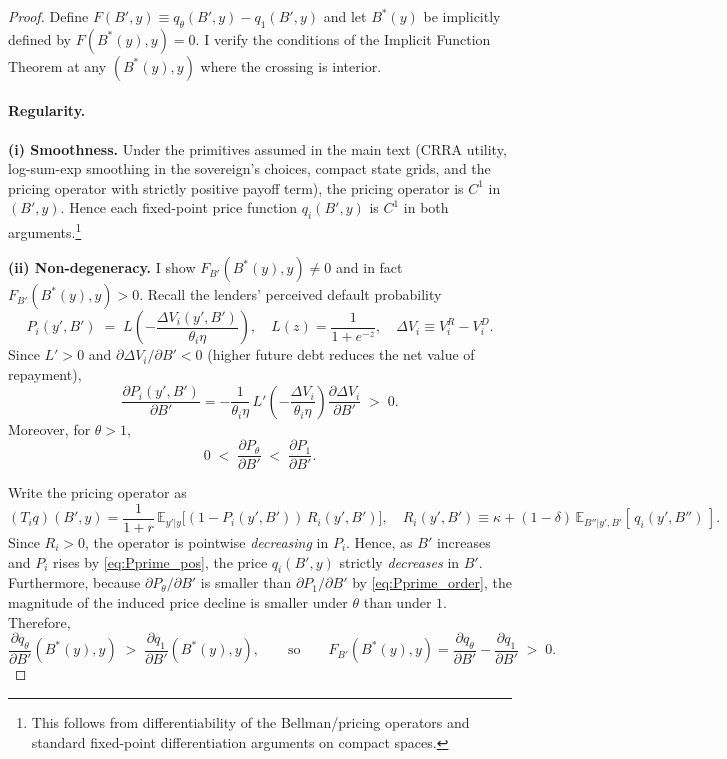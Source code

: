\documentclass[12pt]{article}
\theoremstyle{plain}
\newcommand{\E}{\mathbb{E}}
\begin{document}
\begin{proof}
	Define \(F(B',y)\equiv q_\theta(B',y)-q_1(B',y)\) and let \(B^*(y)\) be implicitly defined by \(F(B^*(y),y)=0\).
	I verify the conditions of the Implicit Function Theorem at any \((B^*(y),y)\) where the crossing is interior.

	\paragraph{Regularity.}
	\textbf{(i) Smoothness.} Under the primitives assumed in the main text (CRRA utility, log-sum-exp smoothing in the sovereign’s choices, compact state grids, and the pricing operator with strictly positive payoff term), the pricing operator is \(C^1\) in \((B',y)\). Hence each fixed-point price function \(q_i(B',y)\) is \(C^1\) in both arguments.\footnote{This follows from differentiability of the Bellman/pricing operators and standard fixed-point differentiation arguments on compact spaces.}

	\textbf{(ii) Non-degeneracy.} I show \(F_{B'}(B^*(y),y)\neq 0\) and in fact \(F_{B'}(B^*(y),y)>0\).
	Recall the lenders’ perceived default probability
	\[
		P_i(y',B') \;=\; L\!\left(-\frac{\Delta V_i(y',B')}{\theta_i\eta}\right),
		\quad L(z)=\frac{1}{1+e^{-z}},\quad
		\Delta V_i \equiv V_i^R - V_i^D.
	\]
	Since \(L'>0\) and \(\partial\Delta V_i/\partial B' < 0\) (higher future debt
	reduces the net value of repayment),
	\begin{equation}
		\frac{\partial P_i(y',B')}{\partial B'}
		= -\frac{1}{\theta_i\eta}\,L'\!\left(-\frac{\Delta V_i}{\theta_i\eta}\right)\frac{\partial \Delta V_i}{\partial B'} \;>\; 0.
		\label{eq:Pprime_pos}
	\end{equation}
	Moreover, for \(\theta>1\),
	\begin{equation}
		0 \;<\; \frac{\partial P_\theta}{\partial B'} \;<\; \frac{\partial P_1}{\partial B'}.
		\label{eq:Pprime_order}
	\end{equation}

	Write the pricing operator as
	\[
		(T_i q)(B',y)=\frac{1}{1+r}\,\E_{y'|y}\!\Big[(1-P_i(y',B'))\,R_i(y',B')\Big],\quad
		R_i(y',B')\equiv \kappa+(1-\delta)\,\E_{B''|y',B'}[\,q_i(y',B'')\,].
	\]
	Since \(R_i>0\), the operator is pointwise \emph{decreasing} in \(P_i\). Hence,
	as \(B'\) increases and \(P_i\) rises by \eqref{eq:Pprime_pos}, the price
	\(q_i(B',y)\) strictly \emph{decreases} in \(B'\). Furthermore, because
	\(\partial P_\theta/\partial B'\) is smaller than \(\partial P_1/\partial B'\)
	by \eqref{eq:Pprime_order}, the magnitude of the induced price decline is
	smaller under \(\theta\) than under \(1\). Therefore,
	\begin{equation}
		\frac{\partial q_\theta}{\partial B'}(B^*(y),y)\;>\;\frac{\partial q_1}{\partial B'}(B^*(y),y),
		\qquad\text{so}\qquad
		F_{B'}(B^*(y),y)=\frac{\partial q_\theta}{\partial B'}-\frac{\partial q_1}{\partial B'}\;>\;0.
		\label{eq:denominator_sign_correct}
	\end{equation}


\end{proof}
\end{document}
